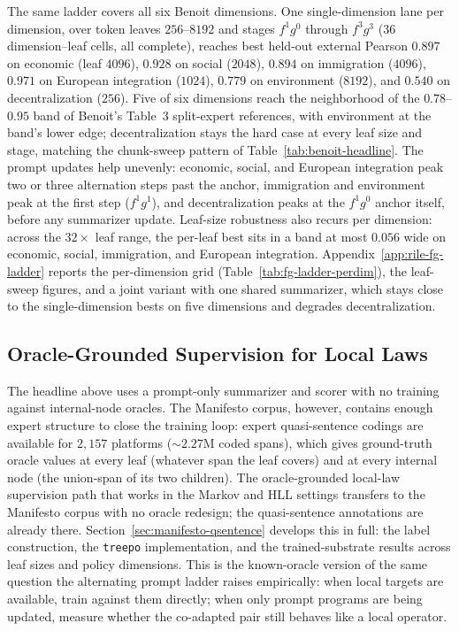 The same ladder covers all six Benoit dimensions. One
single-dimension lane per dimension, over token leaves $256$--$8192$
and stages $f^1 g^0$ through $f^3 g^3$ ($36$ dimension--leaf cells,
all complete), reaches best held-out external Pearson $0.897$ on
economic (leaf $4096$), $0.928$ on social ($2048$), $0.894$ on
immigration ($4096$), $0.971$ on European integration ($1024$),
$0.779$ on environment ($8192$), and $0.540$ on decentralization
($256$). Five of six dimensions reach the neighborhood of the
$0.78$--$0.95$ band of Benoit's Table~3 split-expert references,
with environment at the band's lower edge;
decentralization stays the hard case at every leaf size and stage,
matching the chunk-sweep pattern of Table~\ref{tab:benoit-headline}.
The prompt updates help unevenly: economic, social, and European
integration peak two or three alternation steps past the anchor,
immigration and environment peak at the first step ($f^1 g^1$), and
decentralization peaks at the $f^1 g^0$ anchor itself, before any
summarizer update. Leaf-size robustness also recurs per dimension:
across the $32\times$ leaf range, the per-leaf best sits in a band
at most $0.056$ wide on economic, social, immigration, and European
integration. Appendix~\ref{app:rile-fg-ladder} reports the
per-dimension grid (Table~\ref{tab:fg-ladder-perdim}), the
leaf-sweep figures, and a joint variant with one shared summarizer,
which stays close to the single-dimension bests on five dimensions
and degrades decentralization.

\subsection{Oracle-Grounded Supervision for Local Laws}\label{sec:rile-oracle}

The headline above uses a prompt-only summarizer and scorer with no
training against internal-node oracles. The Manifesto corpus, however,
contains enough expert structure to close the training loop: expert
quasi-sentence codings are available for $2{,}157$ platforms
($\sim\!2.27$M coded spans), which gives ground-truth oracle values at
every leaf (whatever span the leaf covers) and at every internal node
(the union-span of its two children). The oracle-grounded local-law
supervision path that works in the Markov and HLL settings transfers
to the Manifesto corpus with no oracle redesign; the quasi-sentence
annotations are already there. Section~\ref{sec:manifesto-qsentence}
develops this in full: the label construction, the \texttt{treepo}
implementation, and the trained-substrate results across leaf sizes
and policy dimensions. This is the known-oracle version of the same
question the alternating prompt ladder raises empirically: when local
targets are available, train against them directly; when only prompt
programs are being updated, measure whether the co-adapted pair still
behaves like a local operator.

